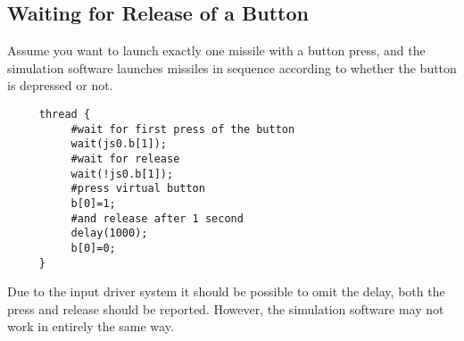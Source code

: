 \documentclass{article}
\begin{document}
\subsection{Waiting for Release of a Button}
Assume you want to launch exactly one missile
with a button press, and the simulation software
launches missiles in sequence according to
whether the button is depressed or not.
\begin{verbatim}
     thread {
          #wait for first press of the button
          wait(js0.b[1]);
          #wait for release 
          wait(!js0.b[1]);
          #press virtual button
          b[0]=1;
          #and release after 1 second
          delay(1000);
          b[0]=0;
     }
\end{verbatim}
Due to the input driver system it should be possible
to omit the delay, both the press and release should
be reported. However, the simulation software
may not work in entirely the same way. 
\end{document}
